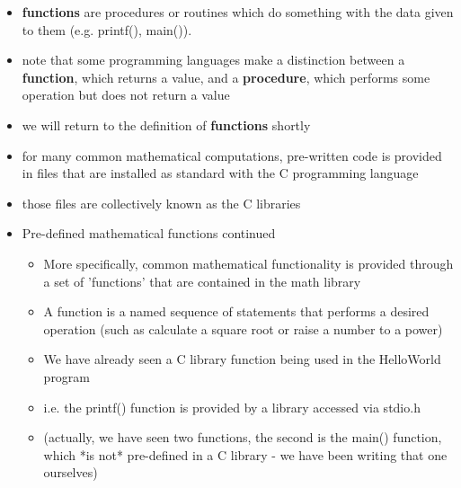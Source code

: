 \documentclass{beamer}
\begin{document}
\begin{frame}
\begin{itemize}
\item \textbf{functions} are procedures or routines which do something with the data given to them (e.g. printf(), main()).
\item note that some programming languages make a distinction between a \textbf{function}, which returns a value, and a \textbf{procedure}, which performs some operation but does not return a value
\item we will return to the definition of \textbf{functions} shortly
\end{itemize}
\end{frame}

\begin{frame}
\begin{itemize}
\item for many common mathematical computations, pre-written code is provided in files that are installed as standard with the C programming language
\item those files are collectively known as the C libraries
\end{itemize}
\end{frame}

\begin{frame}
\begin{itemize}
\item Pre-defined mathematical functions continued
\begin{itemize}
\item More specifically, common mathematical functionality is provided through a set of 'functions' that are contained in the math library
\item A function is a named sequence of statements that performs a desired operation (such as calculate a square root or raise a number to a power) 
\item We have already seen a C library function being used in the HelloWorld program
\item i.e. the printf() function is provided by a library accessed via stdio.h 
\item (actually, we have seen two functions, the second is the main() function, which *is not* pre-defined in a C library - we have been writing that one ourselves)
\end{itemize}
\end{itemize}
\end{frame}
\end{document}
